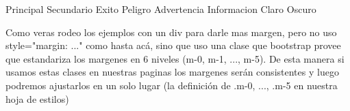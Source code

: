\documentclass[letterpaper,10pt,spanish]{sphinxmanual}
\begin{document}
\begin{sphinxVerbatim}[commandchars=\\\{\}]
 
    Principal
    Secundario
    Exito
    Peligro
    Advertencia
    Informacion
    Claro
    Oscuro
\end{sphinxVerbatim}

Como veras rodeo los ejemplos con un div para darle mas margen, pero no uso
style="margin: ..." como hasta acá, sino que uso una clase que bootstrap provee
que estandariza los margenes en 6 niveles (m-0, m-1, ..., m-5). De esta manera
si usamos estas clases en nuestras paginas los margenes serán consistentes y
luego podremos ajustarlos en un solo lugar (la definición de .m-0, ..., .m-5 en
nuestra hoja de estilos)
\end{document}
